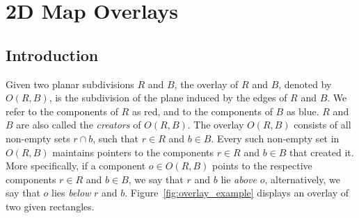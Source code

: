 



\chapter{2D Map Overlays}
\label{chap:intro_ref}
\section{Introduction}

Given two planar subdivisions $R$ and $B$, 
the overlay of $R$ and $B$, 
denoted by $O(R,B)$, is the subdivision of the plane 
induced by the edges of $R$ and $B$.
We refer to the components of $R$ as red, 
and to the components of $B$ as blue.
$R$ and $B$ are also called the {\em creators} of $O(R,B)$.
The overlay $O(R,B)$ consists of all non-empty sets $r \cap b$, 
such that $r \in R$ and $b \in B$. 
Every such non-empty set in $O(R,B)$ maintains 
pointers to the components $r \in R$ and $b \in B$ that created it.
More specifically, if a component $o \in O(R,B)$ points 
to the respective components $r \in R$ and $b \in B$, 
we say that $r$ and $b$ lie {\em above} $o$, 
alternatively, we say that $o$ lies {\em below} $r$ and $b$.
Figure~\ref{fig:overlay_example} displays an overlay 
of two given rectangles.

